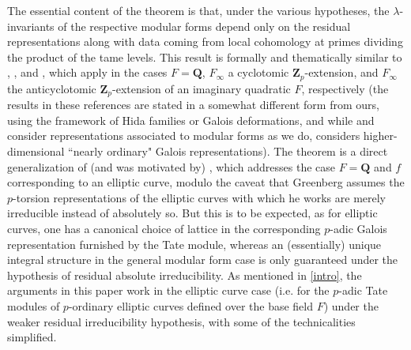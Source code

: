 \documentclass[12 pt]{amsart}
\theoremstyle{plain}
\theoremstyle{definition}
\numberwithin{equation}{section}
\numberwithin{table}{section}
\begin{document}
\indent The essential content of the theorem is that, under the various hypotheses, the $\lambda$-invariants of the respective modular forms depend only on the residual representations along with data coming from local cohomology at primes dividing the product of the tame levels. This result is formally and thematically similar to \cite[Theorem 4.3.3, 4.3.4]{EPW}, \cite[Theorem 3.1, 3.2]{W}, and \cite[Theorem 7.1]{PW11}, which apply in the cases $F=\mathbf{Q}$, $F_\infty$ a cyclotomic $\mathbf{Z}_p$-extension, and $F_\infty$ the anticyclotomic $\mathbf{Z}_p$-extension of an imaginary quadratic $F$, respectively (the results in these references are stated in a somewhat different form from ours, using the framework of Hida families or Galois deformations, and while \cite{EPW} and \cite{PW11} consider representations associated to modular forms as we do, \cite{W} considers higher-dimensional ``nearly ordinary" Galois representations). The theorem is a direct generalization of (and was motivated by) \cite[p. 237]{Gr10}, which addresses the case $F=\mathbf{Q}$ and $f$ corresponding to an elliptic curve, modulo the caveat that Greenberg assumes the $p$-torsion representations of the elliptic curves with which he works are merely irreducible instead of absolutely so. But this is to be expected, as for elliptic curves, one has a canonical choice of lattice in the corresponding $p$-adic Galois representation furnished by the Tate module, whereas an (essentially) unique integral structure in the general modular form case is only guaranteed under the hypothesis of residual absolute irreducibility. As mentioned in \cref{intro}, the arguments in this paper work in the elliptic curve case (i.e. for the $p$-adic Tate modules of $p$-ordinary elliptic curves defined over the base field $F$) under the weaker residual irreducibility hypothesis, with some of the technicalities simplified. \\%
\end{document}
